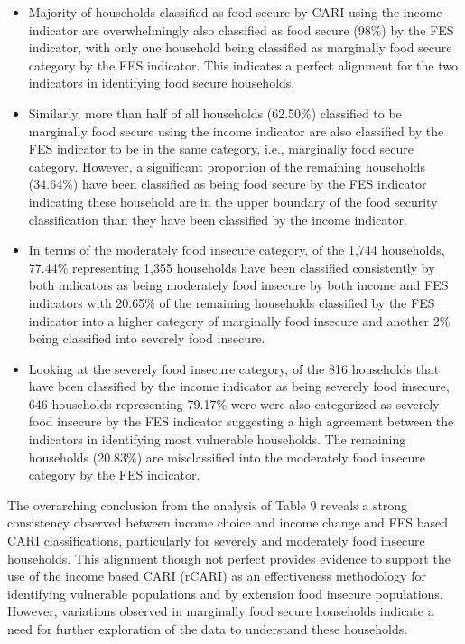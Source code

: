 \documentclass[11pt,harvard]{article}
\begin{document}
	\begin{itemize}
		\item Majority of households classified as food secure by CARI using the income indicator are overwhelmingly also classified as food secure (98\%) by the FES indicator, with only one household being classified as marginally food secure category by the FES indicator. This indicates a perfect alignment for the two indicators in identifying food secure households.
		
		\item Similarly, more than half of all households (62.50\%) classified to be marginally food secure using the income indicator are also classified by the FES indicator to be in the same category, i.e., marginally food secure category. However, a significant proportion of the remaining households  (34.64\%) have been classified as being food secure by the FES indicator indicating these household are in the upper boundary of the food security classification than they have been classified by the income indicator. 
		
		\item In terms of the moderately food insecure category, of the 1,744 households, 77.44\% representing 1,355 households have been classified consistently by both indicators as being moderately food insecure by both income and FES indicators with 20.65\% of the remaining households classified by the FES indicator into a higher category of marginally food insecure and another 2\% being classified into severely food insecure. 
		
		\item Looking at the severely food insecure category, of the 816 households that have been classified by the income indicator as being severely food insecure, 646 households representing 79.17\% were were also categorized as severely food insecure by the FES indicator suggesting a high agreement between the indicators in identifying most vulnerable households. The remaining households (20.83\%) are misclassified into the moderately food insecure category by the FES indicator.
	\end{itemize}
	
	The overarching conclusion from the analysis of Table 9 reveals a strong consistency observed between income choice and income change and FES based CARI classifications, particularly for severely and moderately food insecure households. This alignment though not perfect provides evidence to support the use of the income based CARI (rCARI) as an effectiveness methodology for identifying vulnerable populations and by extension food insecure populations. However, variations observed in marginally food secure households indicate a need for further exploration of the data to understand these households.
	
\end{document}
